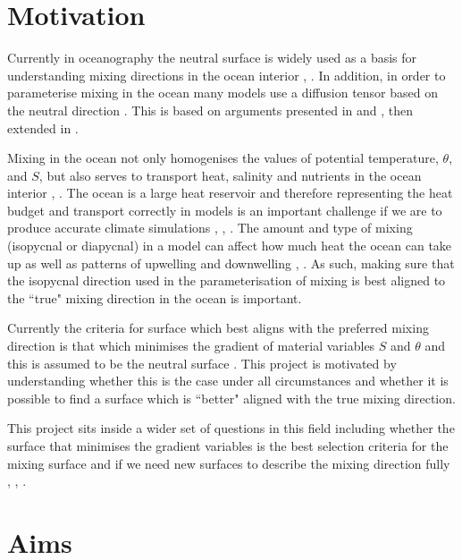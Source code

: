 \label{chapter:Introduction}

\section{Motivation}

Currently in oceanography the neutral surface is widely used as a basis for understanding mixing directions in the ocean interior \citep{Tailleux2016}, \citep{McDougall1987}. In addition, in order to parameterise mixing in the ocean many models use a diffusion tensor based on the neutral direction \citep{McDougall2014}. This is based on arguments presented in \citet{McDougall1987} and \cite{JackettandMcDougall1997}, then extended in \citet{McDougall2014}. 

Mixing in the ocean not only homogenises the values of potential temperature, $\theta$, and $S$, but also serves to transport heat, salinity and nutrients in the ocean interior \citep{Vallis2017}, \cite{OC4}. The ocean is a large heat reservoir and therefore representing the heat budget and transport correctly in models is an important challenge if we are to produce accurate climate simulations \citep{OC1}, \citep{OC4}, \citep{Hochet2019}. The amount and type of mixing (isopycnal or diapycnal) in a model can affect how much heat the ocean can take up as well as patterns of upwelling and downwelling \citep{Veronis1975}, \citep{Gough1995}. As such, making sure that the isopycnal direction used in the parameterisation of mixing is best aligned to the ``true" mixing direction in the ocean is important. 

Currently the criteria for surface which best aligns with the preferred mixing direction is that which minimises the gradient of material variables $S$ and $\theta$ and this is assumed to be the neutral surface \citep{McDougall1987}. This project is motivated by understanding whether this is the case under all circumstances and whether it is possible to find a surface which is ``better" aligned with the true mixing direction. 

This project sits inside a wider set of questions in this field including whether the surface that minimises the gradient variables is the best selection criteria for the mixing surface and if we need new surfaces to describe the mixing direction fully \citep{Hochet2019}, \citep{Nycander2011}, \citep{STANLEY2019}.

\section{Aims}
\label{section:intro_aims}

